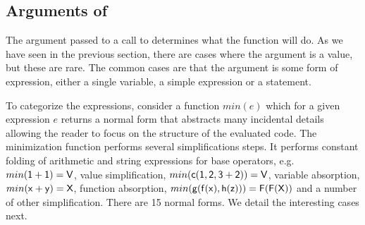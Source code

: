 \documentclass[screen,acmsmall]{acmart}
\begin{document}
\subsection{Arguments of \eval}

The argument passed to a call to \eval determines what the function will do. As
we have seen in the previous section, there are cases where the argument is a
value, but these are rare. The common cases are that the argument is some form
of expression, either a single variable, a simple expression or a statement.

To categorize the expressions, consider a function $min(e)$ which for a given
expression $e$ returns a normal form that abstracts many incidental details
allowing the reader to focus on the structure of the evaluated code. The
minimization function performs several simplifications steps. It performs
constant folding of arithmetic and string expressions for base operators, e.g.
$min({\sf 1+1})={\sf V}$, value simplification, $min({\sf c(1,2,3+2)})={\sf V}$,
variable absorption, $min({\sf x+y})={\sf X}$, function absorption,
$min({\sf g(f(x),h(z))})={\sf F(F(X))}$ and a number of other simplification. There
are 15 normal forms. We detail the interesting cases next.
\end{document}
